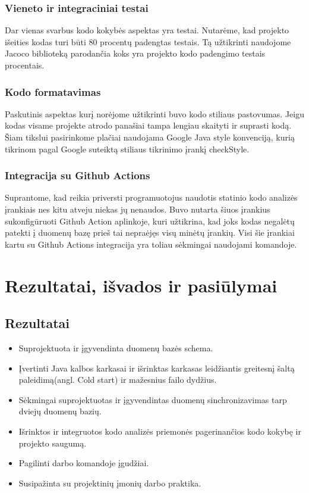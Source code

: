 \documentclass{VUMIFPSkursinis}
\begin{document}
		\subsubsection{Vieneto ir integraciniai testai}
			Dar vienas svarbus kodo kokybės aspektas yra testai.
			Nutarėme, kad projekto išeities kodas turi būti 80 procentų padengtas testais.
			Tą užtikrinti naudojome Jacoco biblioteką parodančia koks yra projekto kodo padengimo testais procentais.
		\subsubsection{Kodo formatavimas}
			Paskutinis aspektas kurį norėjome užtikrinti buvo kodo stiliaus pastovumas.
			Jeigu kodas visame projekte atrodo panašiai tampa lengiau skaityti ir suprasti kodą.
			Šiam tikslui pasirinkome plačiai naudojama Google Java style konvenciją, kurią tikrinom pagal Google suteiktą stiliaus tikrinimo įrankį checkStyle. 
		\subsubsection{Integracija su Github Actions}
			Suprantome, kad reikia priversti programuotojus naudotis statinio kodo analizės įrankiais nes kitu atveju niekas jų nenaudos.
			Buvo nutarta šiuos įrankius sukonfigūruoti Github Action aplinkoje, kuri užtikrina, kad joks kodas negalėtų patekti į duomenų bazę prieš tai nepraėjęs visų minėtų įrankių.
			Visi šie įrankiai kartu su Github Actions integracija yra toliau sėkmingai naudojami komandoje.

		
\section{Rezultatai, išvados ir pasiūlymai}
	\subsection{Rezultatai}
		\begin{itemize}
			\item{Suprojektuota ir įgyvendinta duomenų bazės schema.}
			\item{Įvertinti Java kalbos karkasai ir išrinktas karkasas leidžiantis greitesnį šaltą paleidimą(angl. Cold start) ir mažesnius failo dydžius.}
			\item{Sėkmingai suprojektuotas ir įgyvendintas duomenų sinchronizavimas tarp dviejų duomenų bazių.}
			\item{Išrinktos ir integruotos kodo analizės priemonės pagerinančios kodo kokybę ir projekto saugumą.}
			\item{Pagilinti darbo komandoje įgudžiai.}
			\item{Susipažinta su projektinių įmonių darbo praktika.}
		\end{itemize}
		
\end{document}
